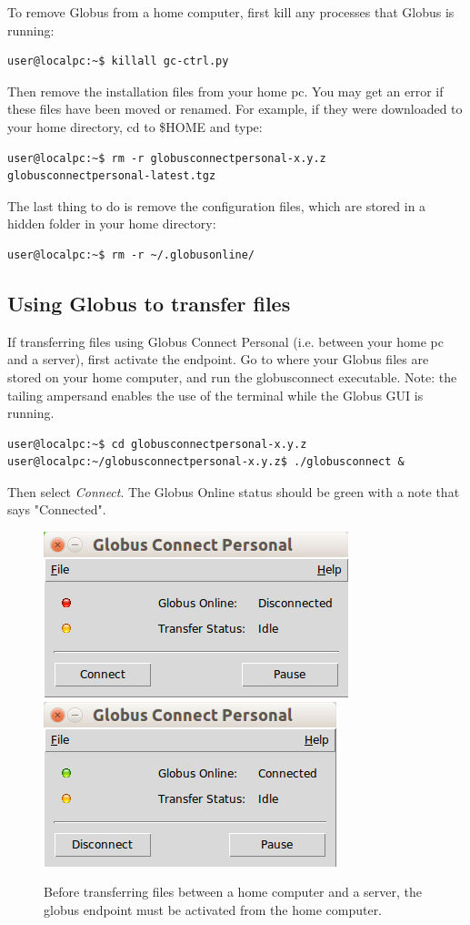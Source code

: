 \documentclass[12pt]{article}
\begin{document}
\quad To remove Globus from a home computer, first kill any processes that Globus is running:
\begin{lstlisting}[numbers=none]
user@localpc:~$ killall gc-ctrl.py
\end{lstlisting}
Then remove the installation files from your home pc. You may get an error if these files have been moved or renamed.  For example, if they were downloaded to your home directory, cd to \$HOME and type:
\begin{lstlisting}[numbers=none]
user@localpc:~$ rm -r globusconnectpersonal-x.y.z globusconnectpersonal-latest.tgz
\end{lstlisting}
The last thing to do is remove the configuration files, which are stored in a hidden folder in your home directory:
\begin{lstlisting}[numbers=none]
user@localpc:~$ rm -r ~/.globusonline/
\end{lstlisting}

\subsection{Using Globus to transfer files}\label{useglobus}

\quad If transferring files using Globus Connect Personal (i.e. between your home pc and a server), first activate the endpoint. Go to where your Globus files are stored on your home computer, and run the globusconnect executable. Note: the tailing ampersand enables the use of the terminal while the Globus GUI is running.

\begin{lstlisting}[numbers=none]
user@localpc:~$ cd globusconnectpersonal-x.y.z
user@localpc:~/globusconnectpersonal-x.y.z$ ./globusconnect &
\end{lstlisting}

Then select \textit{Connect}. The Globus Online status should be green with a note that says "Connected".

\begin{figure}[H]
\centering
\caption{Before transferring files between a home computer and a server, the globus endpoint must be activated from the home computer.}
\includegraphics[width=.46\textwidth]{globus-off} \includegraphics[width=.45\textwidth]{globus-on}
\label{globus-status}
\end{figure}
\end{document}
